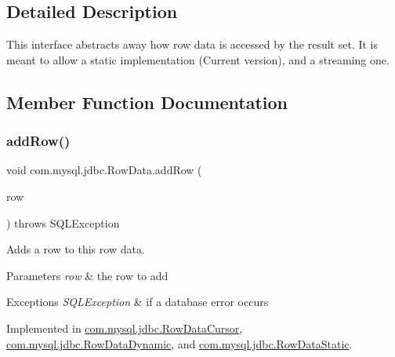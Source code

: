 \subsection{Detailed Description}
This interface abstracts away how row data is accessed by the result set. It is meant to allow a static implementation (Current version), and a streaming one. 

\subsection{Member Function Documentation}
\mbox{\label{interfacecom_1_1mysql_1_1jdbc_1_1_row_data_ac44d5df9c92d845272df5a13f15b9de7}} 
\subsubsection{\texorpdfstring{add\+Row()}{addRow()}}
{\footnotesize\ttfamily void com.\+mysql.\+jdbc.\+Row\+Data.\+add\+Row (\begin{DoxyParamCaption}\item[{\mbox{\hyperlink{classcom_1_1mysql_1_1jdbc_1_1_result_set_row}{Result\+Set\+Row}}}]{row }\end{DoxyParamCaption}) throws S\+Q\+L\+Exception}

Adds a row to this row data.


\begin{DoxyParams}{Parameters}
{\em row} & the row to add \\
\hline
\end{DoxyParams}

\begin{DoxyExceptions}{Exceptions}
{\em S\+Q\+L\+Exception} & if a database error occurs \\
\hline
\end{DoxyExceptions}


Implemented in \mbox{\hyperlink{classcom_1_1mysql_1_1jdbc_1_1_row_data_cursor_aa384c610f8b2ad9b5638214fa92c7dd6}{com.\+mysql.\+jdbc.\+Row\+Data\+Cursor}}, \mbox{\hyperlink{classcom_1_1mysql_1_1jdbc_1_1_row_data_dynamic_a2ce60372d6361c19417d93cbea24a0c9}{com.\+mysql.\+jdbc.\+Row\+Data\+Dynamic}}, and \mbox{\hyperlink{classcom_1_1mysql_1_1jdbc_1_1_row_data_static_aa873d9a679baca7346e37b4c60b5ab52}{com.\+mysql.\+jdbc.\+Row\+Data\+Static}}.

